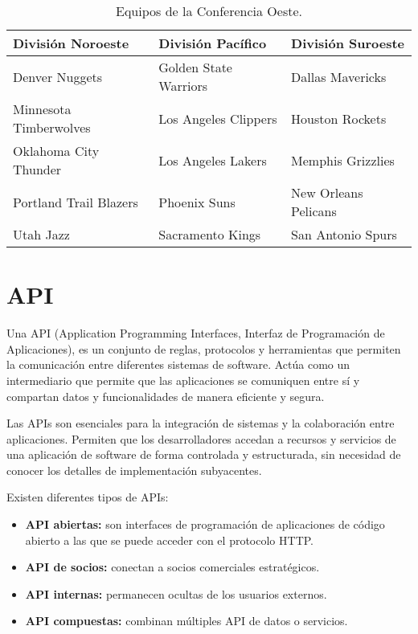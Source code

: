 \begin{table}[h]
    \centering
    \begin{tabular}{|>{\centering\arraybackslash}m{4cm}|>{\centering\arraybackslash}m{4cm}|>{\centering\arraybackslash}m{4cm}|}
        \hline
        \rowcolor[rgb]{0.81,0.81,0.77}
        \textbf{División Noroeste} & \textbf{División Pacífico} & \textbf{División Suroeste} \\
        \hline
        Denver Nuggets & Golden State Warriors & Dallas Mavericks \\
        Minnesota Timberwolves & Los Angeles Clippers & Houston Rockets \\
        Oklahoma City Thunder & Los Angeles Lakers & Memphis Grizzlies \\
        Portland Trail Blazers & Phoenix Suns & New Orleans Pelicans \\
        Utah Jazz & Sacramento Kings & San Antonio Spurs \\
        \hline
    \end{tabular}
    \caption{Equipos de la Conferencia Oeste.}
    \label{tabla:conferencia-oeste}
\end{table}

\hfill

\section{API}

Una API \cite{api} (Application Programming Interfaces, Interfaz de Programación de Aplicaciones), es un conjunto de reglas, protocolos y herramientas que permiten la comunicación entre diferentes sistemas de software. Actúa como un intermediario que permite que las aplicaciones se comuniquen entre sí y compartan datos y funcionalidades de manera eficiente y segura.

Las APIs son esenciales para la integración de sistemas y la colaboración entre aplicaciones. Permiten que los desarrolladores accedan a recursos y servicios de una aplicación de software de forma controlada y estructurada, sin necesidad de conocer los detalles de implementación subyacentes.

Existen diferentes tipos de APIs:
\begin{itemize}
\tightlist
    \item
         \textbf{API abiertas:} son interfaces de programación de aplicaciones de código abierto a las que se puede acceder con el protocolo HTTP.
    \item 
         \textbf{API de socios:} conectan a socios comerciales estratégicos.
    \item 
         \textbf{API internas:} permanecen ocultas de los usuarios externos.
    \item 
         \textbf{API compuestas:} combinan múltiples API de datos o servicios.
\end{itemize}

